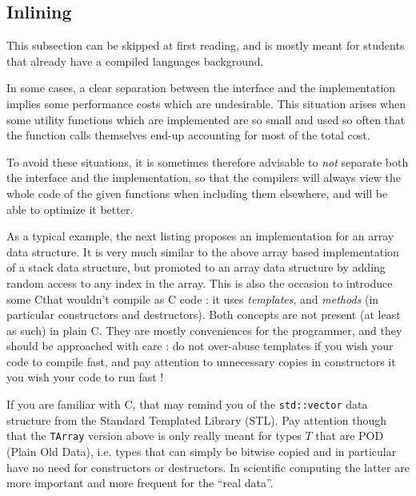 \documentclass[12pt]{article}
\theoremstyle{plain}
\theoremstyle{remark}
\newcommand{\cpp}{C\nolinebreak\hspace{-.05em}\raisebox{.4ex}{\tiny\bf +}\nolinebreak\hspace{-.10em}\raisebox{.4ex}{\tiny\bf +}}
\begin{document}
\subsection{Inlining}

This subsection can be skipped at first reading, and is mostly meant for students 
that already have a compiled languages background.

In some cases, a clear separation between the interface and the implementation 
implies some performance costs which are undesirable. This situation arises
when some utility functions which are implemented are so small and used so often 
that the function calls themselves end-up accounting for most of the total cost.

\medskip

To avoid these situations, it is sometimes therefore advisable to {\it not}
separate both the interface and the implementation, so that the compilers will
always view the whole code of the given functions when including them elsewhere,
and will be able to optimize it better.

\medskip

As a typical example, the next listing proposes an implementation for an array
data structure. It is very much similar to the above array based implementation 
of a stack data structure, but promoted to an array data structure by adding 
random access to any index in the array. This is also the occasion to introduce some
\cpp that wouldn't compile as C code : it uses {\it templates}, and {\it methods} (in particular
constructors and destructors). Both concepts are not present (at least
as such) in plain C. They are mostly conveniences for the programmer, and 
they should be approached with care : do not over-abuse templates if you wish 
your code to compile fast, and pay attention to unnecessary copies in constructors 
it you wish your code to run fast !



If you are familiar with \cpp, that may remind you of the {\tt std::vector} data
structure from the Standard Templated Library (STL). Pay attention though that
the {\tt TArray} version above is only really meant for types $T$ that are POD 
(Plain Old Data), i.e. types that can simply be bitwise copied and in particular 
have no need for constructors or destructors. In scientific computing the latter
are more important and more frequent for the ``real data''.
\end{document}
